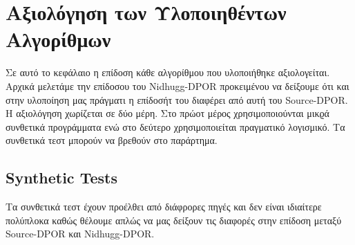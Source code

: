 \chapter{Αξιολόγηση των Υλοποιηθέντων Αλγορίθμων}
\label{Chapter 4}

Σε αυτό το κεφάλαιο η επίδοση κάθε αλγορίθμου που υλοποιήθηκε αξιολογείται. Αρχικά μελετάμε την επίδοσου του 
Nidhugg-DPOR προκειμένου να δείξουμε ότι και στην υλοποίηση μας πράγματι η επίδοσήτ του διαφέρει από αυτή του Source-DPOR. Η
αξιολόγηση χωρίζεται σε δύο μέρη. Στο πρώοτ μέρος χρησιμοποιούνται μικϱά συνθετικά προγράμματα ενώ στο δεύτερο χρησιμοποιείται
πραγματικό λογισμικό. Τα συνθετικά τεστ μπορούν να βρεθούν στο παράρτημα. 

\section{Synthetic Tests}
Τα συνθετικά τεστ έχουν προέλθει από διάφρορες πηγές και δεν είναι ιδιαίτερε πολύπλοκα καθώς θέλουμε απλώς να μας δείξουν τις
διαφορές στην επίδοση μεταξύ Source-DPOR και Nidhugg-DPOR.

